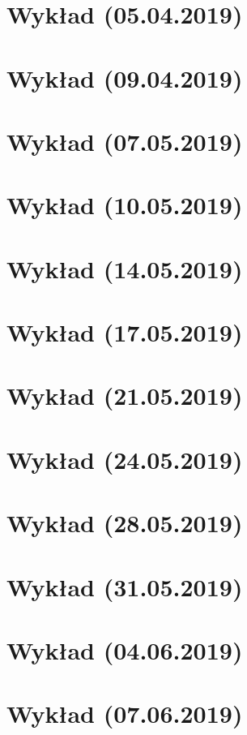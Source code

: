 \documentclass{article}
\begin{document}
\section{Wykład (05.04.2019)}

\pagebreak
\section{Wykład (09.04.2019)}

\pagebreak
\section{Wykład (07.05.2019)}

\pagebreak
\section{Wykład (10.05.2019)}

\pagebreak
\section{Wykład (14.05.2019)}

\pagebreak
\section{Wykład (17.05.2019)}

\pagebreak
\section{Wykład (21.05.2019)}

\pagebreak
\section{Wykład (24.05.2019)}

\pagebreak
\section{Wykład (28.05.2019)}

\pagebreak
\section{Wykład (31.05.2019)}

\pagebreak
\section{Wykład (04.06.2019)}

\pagebreak
\section{Wykład (07.06.2019)}

\pagebreak
\end{document}
